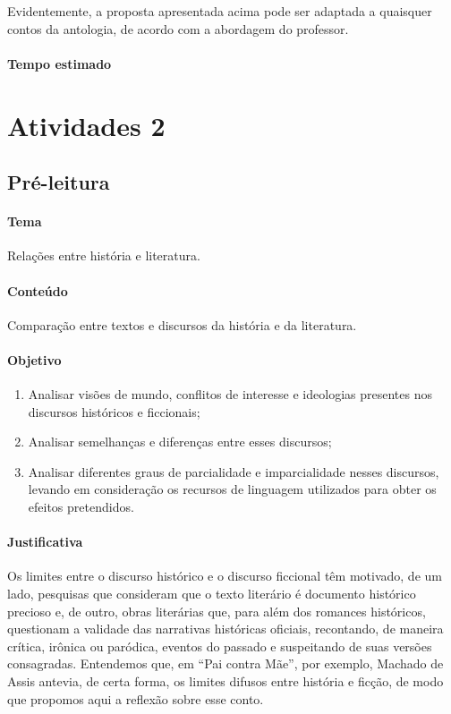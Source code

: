 \documentclass[12pt]{extarticle}
\begin{document}
Evidentemente, a proposta apresentada acima pode ser adaptada a
quaisquer contos da antologia, de acordo com a abordagem do professor.

\paragraph{Tempo estimado}

\section{Atividades 2}

\subsection{Pré-leitura}

%
%

\paragraph{Tema} Relações entre história e literatura.

\paragraph{Conteúdo} Comparação entre textos e discursos da história e da
literatura.

\paragraph{Objetivo} 
\begin{enumerate}
\item
Analisar visões de mundo, conflitos de interesse e
ideologias presentes nos discursos históricos e ficcionais; 
\item
Analisar semelhanças e diferenças entre esses discursos; 
\item
Analisar diferentes
graus de parcialidade e imparcialidade nesses discursos, levando em
consideração os recursos de linguagem utilizados para obter os efeitos
pretendidos.
\end{enumerate}

\paragraph{Justificativa} Os limites entre o discurso histórico e o
discurso ficcional têm motivado, de um lado, pesquisas que consideram
que o texto literário é documento histórico precioso e, de outro, obras
literárias que, para além dos romances históricos, questionam a validade
das narrativas históricas oficiais, recontando, de maneira crítica,
irônica ou paródica, eventos do passado e suspeitando de suas versões
consagradas. Entendemos que, em ``Pai contra Mãe'', por exemplo, Machado
de Assis antevia, de certa forma, os limites difusos entre história e
ficção, de modo que propomos aqui a reflexão sobre esse conto.
\end{document}

